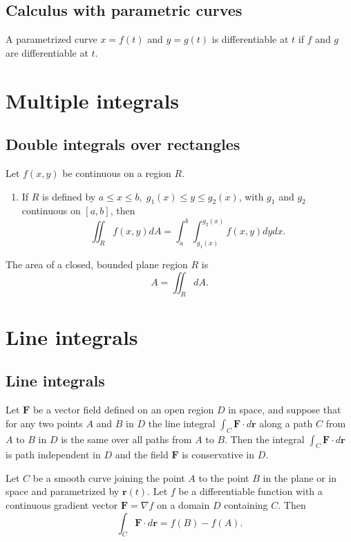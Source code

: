 \documentclass{article}
\begin{document}
\subsection{Calculus with parametric curves}
\begin{remark}
A parametrized curve \(x=f(t)\) and \(y=g(t)\) is differentiable at \(t\) if \(f\) and \(g\) are differentiable at \(t\).
\end{remark}
\section{Multiple integrals}
\subsection{Double integrals over rectangles}
\begin{theorem}
	Let \(f(x,y)\) be continuous on a region \(R\).
	\begin{enumerate}
		\item If \(R\) is defined by \(a\leq x\leq b,\;g_1(x)\leq y\leq g_2(x)\), with \(g_1\) and \(g_2\) continuous on \([a,b]\), then
			\begin{equation*}
				\iint_R f(x,y)dA=\int_a^b\int_{g_1(x)}^{g_2(x)}f(x,y)dydx.
			\end{equation*}
	\end{enumerate}
\end{theorem}
\begin{proposition}
	The area of a closed, bounded plane region \(R\) is
	\begin{equation*}
		A=\iint_R dA.
	\end{equation*}
\end{proposition}
\section{Line integrals}
\subsection{Line integrals}
\begin{definition}
	Let \(\textbf{F}\) be a vector field defined on an open region \(D\) in space, and suppose that for any two points \(A\) and \(B\) in \(D\) the line integral \(\int_C \textbf{F}\cdot d\textbf{r}\) along a path \(C\) from \(A\) to \(B\) in \(D\) is the same over all paths from \(A\) to \(B\). Then the integral \(\int_C\textbf{F}\cdot d\textbf{r}\) is path independent in \(D\) and the field \(\textbf{F}\) is conservative in \(D\).
\end{definition}
\begin{theorem}
	Let \(C\) be a smooth curve joining the point \(A\) to the point \(B\) in the plane or in space and parametrized by \(\textbf{r}(t)\). Let \(f\) be a differentiable function with a continuous gradient vector \(\textbf{F}=\nabla f\) on a domain \(D\) containing \(C\). Then
	\begin{equation*}
		\int_C\textbf{F}\cdot d\textbf{r}=f(B)-f(A).
	\end{equation*}
\end{theorem}
\end{document}
